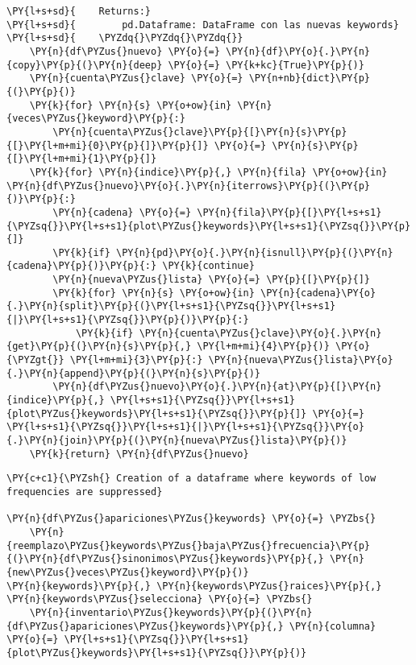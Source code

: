 \begin{tcolorbox}[breakable, size=fbox, boxrule=1pt, pad at break*=1mm,colback=cellbackground, colframe=cellborder]
\begin{Verbatim}[commandchars=\\\{\}]
\PY{l+s+sd}{    Returns:}
\PY{l+s+sd}{        pd.Dataframe: DataFrame con las nuevas keywords}
\PY{l+s+sd}{    \PYZdq{}\PYZdq{}\PYZdq{}}
    \PY{n}{df\PYZus{}nuevo} \PY{o}{=} \PY{n}{df}\PY{o}{.}\PY{n}{copy}\PY{p}{(}\PY{n}{deep} \PY{o}{=} \PY{k+kc}{True}\PY{p}{)}
    \PY{n}{cuenta\PYZus{}clave} \PY{o}{=} \PY{n+nb}{dict}\PY{p}{(}\PY{p}{)}
    \PY{k}{for} \PY{n}{s} \PY{o+ow}{in} \PY{n}{veces\PYZus{}keyword}\PY{p}{:} 
        \PY{n}{cuenta\PYZus{}clave}\PY{p}{[}\PY{n}{s}\PY{p}{[}\PY{l+m+mi}{0}\PY{p}{]}\PY{p}{]} \PY{o}{=} \PY{n}{s}\PY{p}{[}\PY{l+m+mi}{1}\PY{p}{]}
    \PY{k}{for} \PY{n}{indice}\PY{p}{,} \PY{n}{fila} \PY{o+ow}{in} \PY{n}{df\PYZus{}nuevo}\PY{o}{.}\PY{n}{iterrows}\PY{p}{(}\PY{p}{)}\PY{p}{:}
        \PY{n}{cadena} \PY{o}{=} \PY{n}{fila}\PY{p}{[}\PY{l+s+s1}{\PYZsq{}}\PY{l+s+s1}{plot\PYZus{}keywords}\PY{l+s+s1}{\PYZsq{}}\PY{p}{]}
        \PY{k}{if} \PY{n}{pd}\PY{o}{.}\PY{n}{isnull}\PY{p}{(}\PY{n}{cadena}\PY{p}{)}\PY{p}{:} \PY{k}{continue}
        \PY{n}{nueva\PYZus{}lista} \PY{o}{=} \PY{p}{[}\PY{p}{]}
        \PY{k}{for} \PY{n}{s} \PY{o+ow}{in} \PY{n}{cadena}\PY{o}{.}\PY{n}{split}\PY{p}{(}\PY{l+s+s1}{\PYZsq{}}\PY{l+s+s1}{|}\PY{l+s+s1}{\PYZsq{}}\PY{p}{)}\PY{p}{:}
            \PY{k}{if} \PY{n}{cuenta\PYZus{}clave}\PY{o}{.}\PY{n}{get}\PY{p}{(}\PY{n}{s}\PY{p}{,} \PY{l+m+mi}{4}\PY{p}{)} \PY{o}{\PYZgt{}} \PY{l+m+mi}{3}\PY{p}{:} \PY{n}{nueva\PYZus{}lista}\PY{o}{.}\PY{n}{append}\PY{p}{(}\PY{n}{s}\PY{p}{)}
        \PY{n}{df\PYZus{}nuevo}\PY{o}{.}\PY{n}{at}\PY{p}{[}\PY{n}{indice}\PY{p}{,} \PY{l+s+s1}{\PYZsq{}}\PY{l+s+s1}{plot\PYZus{}keywords}\PY{l+s+s1}{\PYZsq{}}\PY{p}{]} \PY{o}{=} \PY{l+s+s1}{\PYZsq{}}\PY{l+s+s1}{|}\PY{l+s+s1}{\PYZsq{}}\PY{o}{.}\PY{n}{join}\PY{p}{(}\PY{n}{nueva\PYZus{}lista}\PY{p}{)}
    \PY{k}{return} \PY{n}{df\PYZus{}nuevo}  
\end{Verbatim}
\end{tcolorbox}

    \begin{tcolorbox}[breakable, size=fbox, boxrule=1pt, pad at break*=1mm,colback=cellbackground, colframe=cellborder]
\begin{Verbatim}[commandchars=\\\{\}]
\PY{c+c1}{\PYZsh{} Creation of a dataframe where keywords of low frequencies are suppressed}

\PY{n}{df\PYZus{}apariciones\PYZus{}keywords} \PY{o}{=} \PYZbs{}
    \PY{n}{reemplazo\PYZus{}keywords\PYZus{}baja\PYZus{}frecuencia}\PY{p}{(}\PY{n}{df\PYZus{}sinonimos\PYZus{}keywords}\PY{p}{,} \PY{n}{new\PYZus{}veces\PYZus{}keyword}\PY{p}{)}
\PY{n}{keywords}\PY{p}{,} \PY{n}{keywords\PYZus{}raices}\PY{p}{,} \PY{n}{keywords\PYZus{}selecciona} \PY{o}{=} \PYZbs{}
    \PY{n}{inventario\PYZus{}keywords}\PY{p}{(}\PY{n}{df\PYZus{}apariciones\PYZus{}keywords}\PY{p}{,} \PY{n}{columna} \PY{o}{=} \PY{l+s+s1}{\PYZsq{}}\PY{l+s+s1}{plot\PYZus{}keywords}\PY{l+s+s1}{\PYZsq{}}\PY{p}{)}
\end{Verbatim}
\end{tcolorbox}

